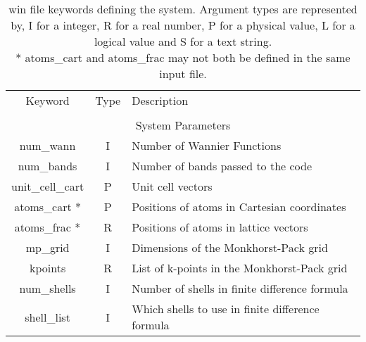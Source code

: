 \begin{table}
\begin{center}
\begin{tabular}{|c|c|p{6cm}|}
\hline
Keyword & Type & Description \\
        &      &             \\
\hline\hline
\multicolumn{3}{|c|}{System Parameters} \\
\hline
{\sc num\_wann }   & I & Number of Wannier Functions \\
{\sc num\_bands }   & I & Number of bands passed to the code \\
{\sc unit\_cell\_cart }   & P & Unit cell vectors \\
{\sc atoms\_cart }*   & P & Positions of atoms in Cartesian coordinates \\
{\sc atoms\_frac }*   & R & Positions of atoms in lattice vectors \\
{\sc mp\_grid }   & I & Dimensions of the Monkhorst-Pack grid \\
{\sc kpoints }   & R & List of k-points in the Monkhorst-Pack grid \\
{\sc num\_shells }   & I & Number of shells in finite difference formula \\
{\sc shell\_list }   & I & Which shells to use in finite difference formula \\
\hline
\end{tabular}
\caption[Parameter file keywords controlling system parameters.]
{win file keywords defining the system.  Argument types
are represented by, I for a integer, R for a real number, P for a
physical value, L for a logical value and S for a text string.\\
 {\footnotesize
* {\sc atoms\_cart } and  {\sc atoms\_frac } may not both be defined in
the same input file. }} 
\label{parameter_keywords1}
\end{center}
\end{table}


